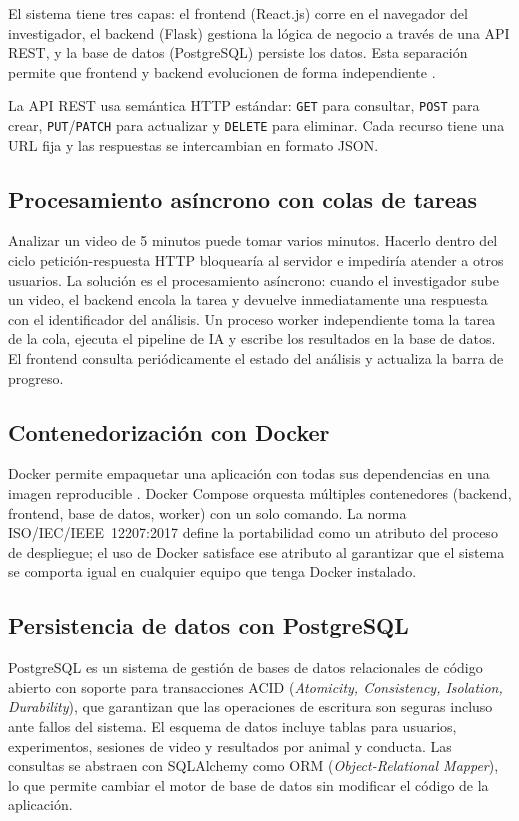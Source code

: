 El sistema tiene tres capas: el frontend (React.js) corre en el navegador del
investigador, el backend (Flask) gestiona la lógica de negocio a través de una API
REST, y la base de datos (PostgreSQL) persiste los datos. Esta separación permite que
frontend y backend evolucionen de forma independiente \cite{grinberg2018}.

La API REST usa semántica HTTP estándar: \texttt{GET} para consultar,
\texttt{POST} para crear, \texttt{PUT}/\texttt{PATCH} para actualizar y
\texttt{DELETE} para eliminar. Cada recurso tiene una URL fija y las respuestas
se intercambian en formato JSON.

\subsection{Procesamiento asíncrono con colas de tareas}

Analizar un video de 5 minutos puede tomar varios minutos. Hacerlo dentro del ciclo
petición-respuesta HTTP bloquearía al servidor e impediría atender a otros usuarios.
La solución es el procesamiento asíncrono: cuando el investigador sube un video, el
backend encola la tarea y devuelve inmediatamente una respuesta con el identificador
del análisis. Un proceso worker independiente toma la tarea de la cola, ejecuta el
pipeline de IA y escribe los resultados en la base de datos. El frontend consulta
periódicamente el estado del análisis y actualiza la barra de progreso.

\subsection{Contenedorización con Docker}

Docker permite empaquetar una aplicación con todas sus dependencias en una imagen
reproducible \cite{merkel2014}. Docker Compose orquesta múltiples contenedores
(backend, frontend, base de datos, worker) con un solo comando. La norma
ISO/IEC/IEEE~12207:2017 \cite{iso12207} define la portabilidad como un atributo del
proceso de despliegue; el uso de Docker satisface ese atributo al garantizar que el
sistema se comporta igual en cualquier equipo que tenga Docker instalado.

\subsection{Persistencia de datos con PostgreSQL}

PostgreSQL es un sistema de gestión de bases de datos relacionales de código abierto
con soporte para transacciones ACID (\textit{Atomicity, Consistency, Isolation,
Durability}), que garantizan que las operaciones de escritura son seguras incluso ante
fallos del sistema. El esquema de datos incluye tablas para usuarios, experimentos,
sesiones de video y resultados por animal y conducta. Las consultas se abstraen con
SQLAlchemy como ORM (\textit{Object-Relational Mapper}), lo que permite cambiar el
motor de base de datos sin modificar el código de la aplicación.

